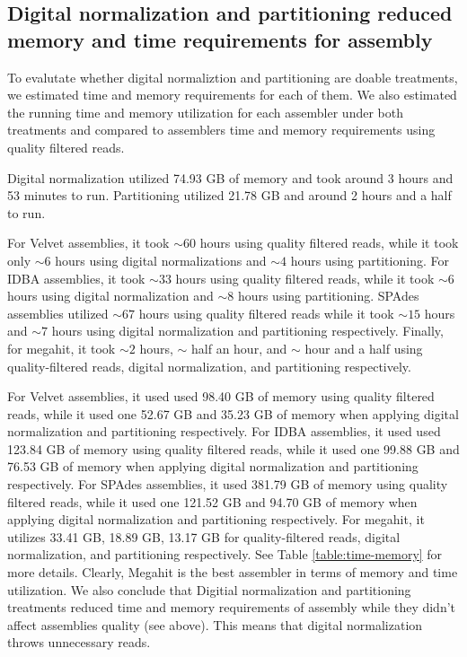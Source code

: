 \subsection*{Digital normalization and partitioning reduced memory and time requirements for assembly}

To evalutate whether digital normaliztion and partitioning are doable treatments, we estimated time and memory requirements for each of them. We also estimated the running time and memory utilization for each assembler under both treatments and compared to assemblers time and memory requirements using quality filtered reads.  

Digital normalization utilized 74.93  GB of memory and took  around 3 hours and 53 minutes to run. Partitioning utilized 21.78 GB and around 2 hours and a half  to run.

For Velvet assemblies, it  took $\sim 60$ hours using quality filtered reads, while it took only  $\sim 6$ hours using digital normalizations and  $\sim 4$ hours using partitioning.  For IDBA assemblies, it took $\sim 33$ hours using quality filtered reads, while it took $\sim 6$ hours using digital normalization and $\sim 8$ hours using partitioning. SPAdes assemblies utilized $\sim 67$ hours using quality filtered reads  while it took $\sim15$ hours and $\sim 7$ hours using digital normalization and partitioning respectively. Finally, for megahit, it  took $\sim 2$ hours, $\sim$ half an hour, and $\sim$ hour and a half using quality-filtered reads, digital normalization, and partitioning respectively. 
 
 For Velvet assemblies, it used used 98.40 GB of memory using quality filtered reads, while it used one 52.67 GB and  35.23 GB of memory when applying digital normalization and partitioning respectively. For IDBA assemblies, it used used 123.84 GB of memory using quality filtered reads, while it used one 99.88 GB and 76.53 GB of memory when applying digital normalization and partitioning respectively. For SPAdes assemblies, it used 381.79 GB of memory using quality filtered reads, while it used one 121.52 GB and 94.70 GB of memory when applying digital normalization and partitioning respectively.  For megahit, it utilizes 33.41 GB, 18.89 GB,  13.17 GB for quality-filtered reads, digital normalization, and partitioning respectively. See Table \ref{table:time-memory} for more details. 
Clearly, Megahit is the best assembler in terms of memory and time utilization. We also conclude that Digitial normalization and partitioning treatments reduced time and memory requirements of assembly while they didn't affect assemblies quality (see above). This means that digital normalization throws unnecessary reads. 

